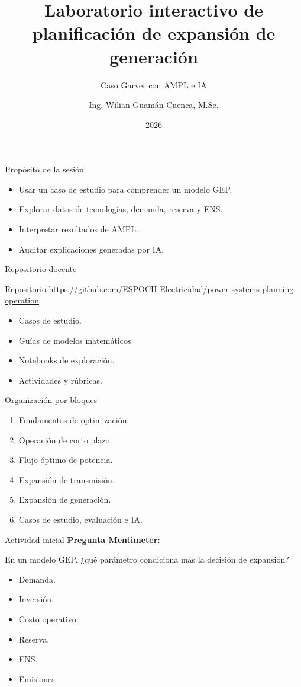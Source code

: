 \documentclass[aspectratio=169]{beamer}
\title{Laboratorio interactivo de planificación de expansión de generación}
\subtitle{Caso Garver con AMPL e IA}
\author{Ing. Wilian Guamán Cuenca, M.Sc.}
\institute{ESPOCH -- Electricidad}
\date{2026}
\begin{document}
\begin{frame}
  \titlepage
\end{frame}

\begin{frame}{Propósito de la sesión}
  \begin{itemize}
    \item Usar un caso de estudio para comprender un modelo GEP.
    \item Explorar datos de tecnologías, demanda, reserva y ENS.
    \item Interpretar resultados de AMPL.
    \item Auditar explicaciones generadas por IA.
  \end{itemize}
\end{frame}

\begin{frame}{Repositorio docente}
  \begin{block}{Repositorio}
  \url{https://github.com/ESPOCH-Electricidad/power-systems-planning-operation}
  \end{block}
  \begin{itemize}
    \item Casos de estudio.
    \item Guías de modelos matemáticos.
    \item Notebooks de exploración.
    \item Actividades y rúbricas.
  \end{itemize}
\end{frame}

\begin{frame}{Organización por bloques}
  \begin{enumerate}
    \item Fundamentos de optimización.
    \item Operación de corto plazo.
    \item Flujo óptimo de potencia.
    \item Expansión de transmisión.
    \item Expansión de generación.
    \item Casos de estudio, evaluación e IA.
  \end{enumerate}
\end{frame}

\begin{frame}{Actividad inicial}
  \textbf{Pregunta Mentimeter:}

  En un modelo GEP, ¿qué parámetro condiciona más la decisión de expansión?

  \begin{itemize}
    \item Demanda.
    \item Inversión.
    \item Costo operativo.
    \item Reserva.
    \item ENS.
    \item Emisiones.
  \end{itemize}
\end{frame}
\end{document}
